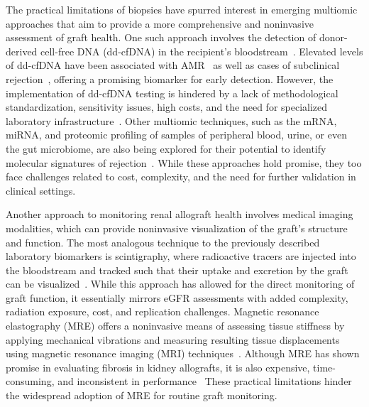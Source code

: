 
The practical limitations of biopsies have spurred interest in emerging multiomic approaches that aim to provide a more comprehensive and noninvasive assessment of graft health. One such approach involves the detection of donor-derived cell-free DNA (dd-cfDNA) in the recipient's bloodstream~\cite{bloom_CellFree_2017}. Elevated levels of dd-cfDNA have been associated with AMR~\cite{bloom_CellFree_2017} as well as cases of subclinical rejection~\cite{aubert_Cellfree_2024}, offering a promising biomarker for early detection. However, the implementation of dd-cfDNA testing is hindered by a lack of methodological standardization, sensitivity issues, high costs, and the need for specialized laboratory infrastructure~\cite{chua_Challenges_2025,song_Limitations_2022}. Other multiomic techniques, such as the mRNA, miRNA, and proteomic profiling of samples of peripheral blood, urine, or even the gut microbiome, are also being explored for their potential to identify molecular signatures of rejection~\cite{goutaudier_Evaluation_2024,marquet_thorough_2025,vanloon_Diagnostic_2021,lubetzky_Urinary_2021,gielis_Combined_2021,holle_Gut_2025}. While these approaches hold promise, they too face challenges related to cost, complexity, and the need for further validation in clinical settings.


Another approach to monitoring renal allograft health involves medical imaging modalities, which can provide noninvasive visualization of the graft's structure and function. The most analogous technique to the previously described laboratory biomarkers is scintigraphy, where radioactive tracers are injected into the bloodstream and tracked such that their uptake and excretion by the graft can be visualized~\cite{alnazer_Recent_2021}. While this approach has allowed for the direct monitoring of graft function, it essentially mirrors eGFR assessments with added complexity, radiation exposure, cost, and replication challenges. Magnetic resonance elastography (MRE) offers a noninvasive means of assessing tissue stiffness by applying mechanical vibrations and measuring resulting tissue displacements using magnetic resonance imaging (MRI) techniques~\cite{lee_MR_2012}. Although MRE has shown promise in evaluating fibrosis in kidney allografts, it is also expensive, time-consuming, and inconsistent in performance~\cite{wilson_More_2020} These practical limitations hinder the widespread adoption of MRE for routine graft monitoring.

